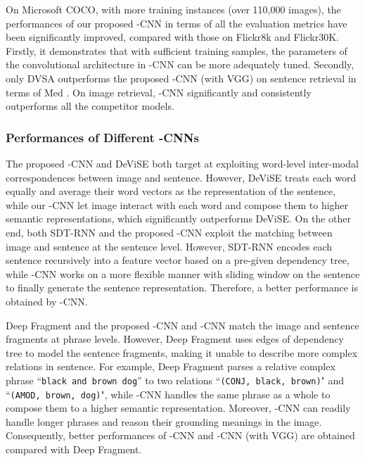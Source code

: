 \documentclass[10pt,twocolumn,letterpaper]{article}
\begin{document}
On Microsoft COCO, with more training instances (over 110,000 images), the performances of our proposed -CNN in terms of all the evaluation metrics have been significantly improved, compared with those on Flickr8k and Flickr30K. Firstly, it demonstrates that with sufficient training samples, the parameters of the convolutional architecture in -CNN can be more adequately tuned. Secondly, only DVSA outperforms the proposed -CNN (with VGG) on sentence retrieval in terms of Med . On image retrieval, -CNN significantly and consistently outperforms all the competitor models.












\vspace{-5pt}
\subsubsection {Performances of Different -CNNs}


The proposed -CNN and DeViSE \cite{frome_nips2013} both target at exploiting word-level inter-modal correspondences between image and sentence. However, DeViSE treats each word equally and average their word vectors as the representation of the sentence, while our -CNN let image interact with each word and compose them to higher semantic representations, which significantly outperforms DeViSE. On the other end, both SDT-RNN \cite{socher_tacl2014} and the proposed -CNN exploit the matching between image and sentence at the sentence level. However, SDT-RNN encodes each sentence recursively into a feature vector based on a pre-given dependency tree, while -CNN works on a more flexible manner with sliding window on the sentence to finally generate the sentence representation. Therefore, a better performance is obtained by  -CNN.

Deep Fragment \cite{karpathy_2014} and the proposed -CNN and -CNN match the image and sentence fragments at phrase levels. However, Deep Fragment uses edges of dependency tree to model the sentence fragments, making it unable to describe more complex relations in sentence. For example, Deep Fragment parses a relative complex phrase ``\texttt{\small black and brown dog}'' to two relations  ``\texttt{\small (CONJ, black, brown)}" and ``\texttt{\small (AMOD, brown, dog)}", while -CNN handles the same phrase as a whole to compose them to a higher semantic representation. Moreover, -CNN can readily handle longer phrases and reason their grounding meanings in the image. Consequently, better performances of -CNN and -CNN (with VGG) are obtained compared with Deep Fragment.
\end{document}
